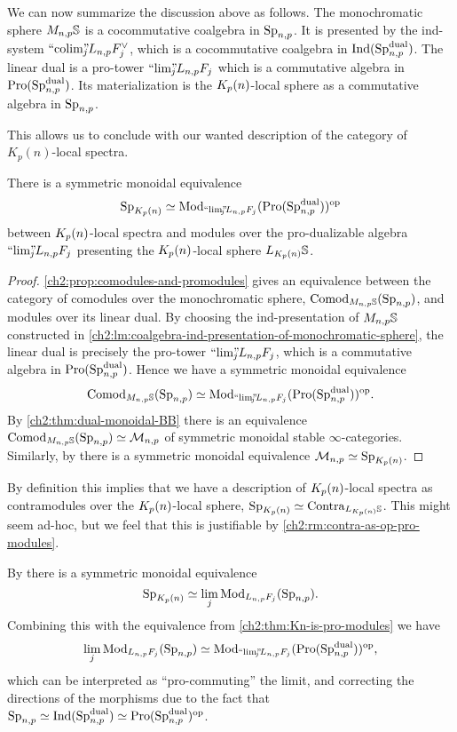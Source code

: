 We can now summarize the discussion above as follows. The monochromatic sphere $M_{n,p}\mathbb{S}$ is a cocommutative coalgebra in $\mathrm{Sp}_{n,p}$. It is presented by the ind-system $``\!\operatorname{colim}\!"_{\hspace{-5pt} j} L_{n,p} F_j^\vee$, which is a cocommutative coalgebra in $\operatorname{Ind}(\mathrm{Sp}_{n,p}^{\mathrm{dual}})$. The linear dual is a pro-tower $``\!\lim\!"_{\hspace{-5pt} j} L_{n,p} F_j$ which is a commutative algebra in $\operatorname{Pro}(\mathrm{Sp}_{n,p}^{\mathrm{dual}})$. Its materialization is the ${K_p(n)}$-local sphere as a commutative algebra in $\mathrm{Sp}_{n,p}$. 

This allows us to conclude with our wanted description of the category of $K_p(n)$-local spectra. 

\begin{theorem}
    \label{ch2:thm:Kn-is-pro-modules}
    There is a symmetric monoidal equivalence 
    \[\mathrm{Sp}_{{K_p(n)}} \simeq \mathrm{Mod}_{``\!\lim\!"_{\hspace{-5pt} j} L_{n,p} F_j}(\operatorname{Pro}(\mathrm{Sp}_{n,p}^{\mathrm{dual}}))^{\mathrm{op}}\]
    between ${K_p(n)}$-local spectra and modules over the pro-dualizable algebra $``\!\lim\!"_{\hspace{-5pt} j} L_{n,p} F_j$ presenting the ${K_p(n)}$-local sphere $L_{K_p(n)}\mathbb{S}$. 
\end{theorem}
\begin{proof}
    \cref{ch2:prop:comodules-and-promodules} gives an equivalence between the category of comodules over the monochromatic sphere, $\mathrm{Comod}_{M_{n,p} \mathbb{S}}(\mathrm{Sp}_{n,p})$, and modules over its linear dual. By choosing the ind-presentation of $M_{n,p} \mathbb{S}$ constructed in \cref{ch2:lm:coalgebra-ind-presentation-of-monochromatic-sphere}, the linear dual is precisely the pro-tower $``\!\lim\!"_{\hspace{-5pt} j} L_{n,p} F_j$, which is a commutative algebra in $\operatorname{Pro}(\mathrm{Sp}_{n,p}^{\mathrm{dual}})$. Hence we have a symmetric monoidal equivalence 
    \[\mathrm{Comod}_{M_{n,p}\mathbb{S}}(\mathrm{Sp}_{n,p})\simeq \mathrm{Mod}_{``\!\lim\!"_{\hspace{-5pt} j} L_{n,p} F_j}(\operatorname{Pro}(\mathrm{Sp}_{n,p}^{\mathrm{dual}}))^{\mathrm{op}}.\]
    By \cref{ch2:thm:dual-monoidal-BB} there is an equivalence $\mathrm{Comod}_{M_{n,p}\mathbb{S}}(\mathrm{Sp}_{n,p})\simeq \mathcal{M}_{n,p}$ of symmetric monoidal stable $\infty$-categories. Similarly, by \cite[6.19]{hovey-strickland_99} there is a symmetric monoidal equivalence $\mathcal{M}_{n,p} \simeq \mathrm{Sp}_{{K_p(n)}}$. 
\end{proof}

\begin{remark}
    By definition this implies that we have a description of ${K_p(n)}$-local spectra as contramodules over the ${K_p(n)}$-local sphere, $\mathrm{Sp}_{{K_p(n)}} \simeq \mathrm{Contra}_{L_{K_p(n)}\mathbb{S}}$. This might seem ad-hoc, but we feel that this is justifiable by \cref{ch2:rm:contra-as-op-pro-modules}.
\end{remark}

\begin{remark}
    By \cite[2.2.1, 2.2.7]{li-zhang_2023} there is a symmetric monoidal equivalence 
    \[\mathrm{Sp}_{K_p(n)} \simeq \lim_j \mathrm{Mod}_{L_{n,p} F_j}(\mathrm{Sp}_{n,p}).\]
    Combining this with the equivalence from \cref{ch2:thm:Kn-is-pro-modules} we have 
    \[\lim_j \mathrm{Mod}_{L_{n,p} F_j}(\mathrm{Sp}_{n,p}) \simeq \mathrm{Mod}_{``\!\lim\!"_{\hspace{-5pt} j} L_{n,p} F_j}(\operatorname{Pro}(\mathrm{Sp}_{n,p}^{\mathrm{dual}}))^{\mathrm{op}},\]
    which can be interpreted as ``pro-commuting'' the limit, and correcting the directions of the morphisms due to the fact that $\mathrm{Sp}_{n,p}\simeq \operatorname{Ind}(\mathrm{Sp}_{n,p}^{\mathrm{dual}}) \simeq \operatorname{Pro}(\mathrm{Sp}_{n,p}^{\mathrm{dual}})^{\mathrm{op}}$. 
\end{remark}

